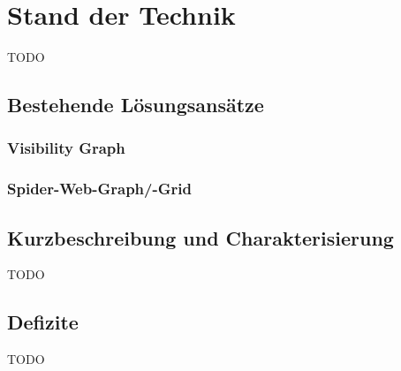 \section{Stand der Technik}
\label{sec:Stand der Technik}
TODO

\subsection{Bestehende Lösungsansätze}
\label{sub:Bestehende Lösungsansätze}

\subsubsection{Visibility Graph}
\label{subsub:Visibility Graph}

\subsubsection{Spider-Web-Graph/-Grid}
\label{subsub:Spider-Web-Graph/-Grid}


\subsection{Kurzbeschreibung und Charakterisierung}
\label{sub:Kurzbeschreibung und Charakterisierung}
TODO

\subsection{Defizite}
\label{sub:Defizite}
TODO

